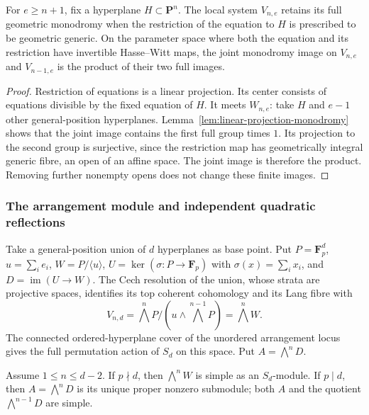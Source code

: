 \begin{corollary}\label{cor:restriction-independent-monodromy}
For $e\geq n+1$, fix a hyperplane $H\subset\mathbf P^n$.
The local system $V_{n,e}$ retains its full geometric monodromy
when the restriction of the equation to $H$ is prescribed to be
geometric generic.  On the parameter space where both the
equation and its restriction have invertible Hasse--Witt maps,
the joint monodromy image on $V_{n,e}$ and $V_{n-1,e}$ is the
product of their two full images.
\end{corollary}

\begin{proof}
Restriction of equations is a linear projection.  Its center
consists of equations divisible by the fixed equation of $H$.
It meets $W_{n,e}$: take $H$ and $e-1$ other general-position
hyperplanes.  Lemma~\ref{lem:linear-projection-monodromy} shows
that the joint image contains the first full group times $1$.
Its projection to the second group is surjective, since the
restriction map has geometrically integral generic fibre, an
open of an affine space.  The joint image is therefore the
product.  Removing further nonempty opens does not change
these finite images.
\end{proof}

\subsubsection{The arrangement module and independent quadratic reflections}

Take a general-position union of $d$ hyperplanes as base point.
Put $P=\mathbf F_p^d$, $u=\sum_i e_i$, $W=P/\langle u\rangle$,
$U=\ker(\sigma:P\to\mathbf F_p)$ with $\sigma(x)=\sum_i x_i$,
and $D=\operatorname{im}(U\to W)$.  The Cech resolution of the
union, whose strata are projective spaces, identifies its top
coherent cohomology and its Lang fibre with
\begin{equation}\label{eq:pn-arrangement-module}
 V_{n,d}=\bigwedge^nP/(u\wedge\bigwedge^{n-1}P)
       =\bigwedge^nW.
\end{equation}
The connected ordered-hyperplane cover of the unordered
arrangement locus gives the full permutation action of $S_d$
on this space.  Put $A=\bigwedge^nD$.

\begin{lemma}\label{lem:odd-general-hook-module}
Assume $1\leq n\leq d-2$.  If $p\nmid d$, then
$\bigwedge^nW$ is simple as an $S_d$-module.  If $p\mid d$, then
$A=\bigwedge^nD$ is its unique proper nonzero submodule; both
$A$ and the quotient $\bigwedge^{n-1}D$ are simple.
\end{lemma}

